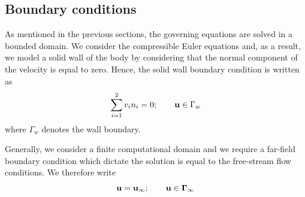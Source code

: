 \documentclass[review]{elsarticle}
\begin{document}
\subsection{Boundary conditions}
As mentioned in the previous sections, the governing equations are solved in a bounded domain. We consider the compressible Euler equations and, as a result, we model a solid wall of the body by considering that the normal component of the velocity is equal to zero. Hence, the solid wall boundary condition is written as
\begin{equation}\label{eq:bcwall}
\sum_{i=1}^2v_i n_i=0; \qquad {{\bf u}}\in \Gamma_w
\end{equation}
where $\Gamma_w$ denotes the wall boundary.
\par Generally, we consider a finite computational domain and we require a far-field boundary condition which dictate the solution is equal to the free-stream flow conditions. We therefore write
\begin{equation}\label{eq:bcff}
\bf u=\bf u_\infty; \qquad {{\bf u}}\in \Gamma_\infty
\end{equation}
\end{document}
